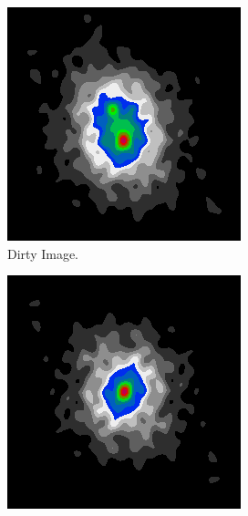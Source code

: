 \begin{figure}[h]
	\centering
	\begin{subfigure}[b]{0.3\linewidth}
		\includegraphics[width=\linewidth]{./chapters/03.distribution/simulated/dirty.png}
		\caption{Dirty Image.}
		\label{cd:efficient:gradients:dirty}
	\end{subfigure}
	\begin{subfigure}[b]{0.3\linewidth}
		\includegraphics[width=\linewidth]{./chapters/03.distribution/simulated/psf.png}

\end{subfigure}
\end{figure}
